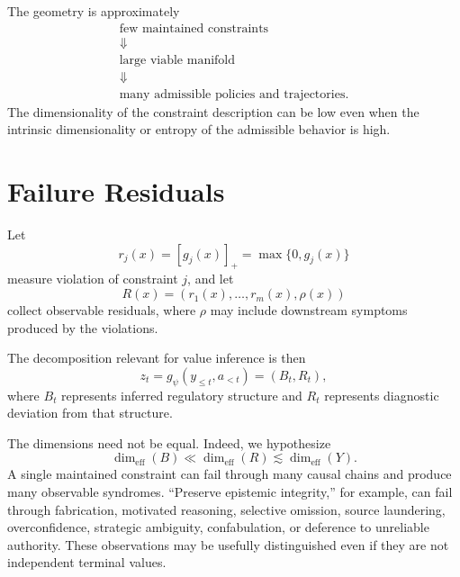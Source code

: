\documentclass[11pt]{article}
\begin{document}
The geometry is approximately
\begin{equation}
\boxed{
\begin{array}{c}
\text{few maintained constraints}\\[2pt]
\Downarrow\\[2pt]
\text{large viable manifold}\\[2pt]
\Downarrow\\[2pt]
\text{many admissible policies and trajectories}.
\end{array}}
\label{eq:capgeometry}
\end{equation}
The dimensionality of the constraint description can be low even when the intrinsic dimensionality or entropy of the admissible behavior is high.

\section{Failure Residuals}

Let
\begin{equation}
    r_j(x)
    =
    [g_j(x)]_+
    =
    \max\{0,g_j(x)\}
\end{equation}
measure violation of constraint $j$, and let
\[
    R(x)=(r_1(x),\ldots,r_m(x),\rho(x))
\]
collect observable residuals, where $\rho$ may include downstream symptoms produced by the violations.

The decomposition relevant for value inference is then
\begin{equation}
    z_t=g_\psi(y_{\leq t},a_{<t})
    =
    (B_t,R_t),
    \label{eq:decomposition}
\end{equation}
where $B_t$ represents inferred regulatory structure and $R_t$ represents diagnostic deviation from that structure.

The dimensions need not be equal. Indeed, we hypothesize
\begin{equation}
    \dim_{\mathrm{eff}}(B)
    \ll
    \dim_{\mathrm{eff}}(R)
    \lesssim
    \dim_{\mathrm{eff}}(Y).
    \label{eq:rank}
\end{equation}
A single maintained constraint can fail through many causal chains and produce many observable syndromes. ``Preserve epistemic integrity,'' for example, can fail through fabrication, motivated reasoning, selective omission, source laundering, overconfidence, strategic ambiguity, confabulation, or deference to unreliable authority. These observations may be usefully distinguished even if they are not independent terminal values.
\end{document}
